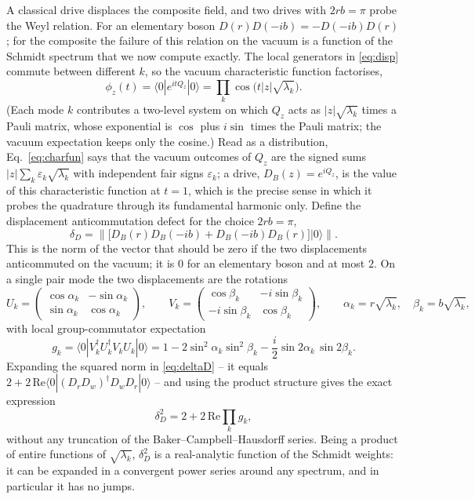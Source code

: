 \documentclass[11pt,a4paper]{article}
\newcommand{\ket}[1]{|#1\rangle}
\newcommand{\bra}[1]{\langle#1|}
\begin{document}
A classical drive displaces the composite field, and two drives with $2rb=\pi$ probe the Weyl relation. For an elementary boson $D(r)D(-ib)=-D(-ib)D(r)$; for the composite the failure of this relation on the vacuum is a function of the Schmidt spectrum that we now compute exactly. The local generators in \eqref{eq:disp} commute between different $k$, so the vacuum characteristic function factorises,
\begin{equation}
\phi_z(t)=\bra{0}e^{itQ_z}\ket{0}=\prod_k\cos\big(t|z|\sqrt{\lambda_k}\big).
\label{eq:charfun}
\end{equation}
(Each mode $k$ contributes a two-level system on which $Q_z$ acts as $|z|\sqrt{\lambda_k}$ times a Pauli matrix, whose exponential is $\cos$ plus $i\sin$ times the Pauli matrix; the vacuum expectation keeps only the cosine.) Read as a distribution, Eq.~\eqref{eq:charfun} says that the vacuum outcomes of $Q_z$ are the signed sums $|z|\sum_k\varepsilon_k\sqrt{\lambda_k}$ with independent fair signs $\varepsilon_k$; a drive, $D_B(z)=e^{iQ_z}$, is the value of this characteristic function at $t=1$, which is the precise sense in which it probes the quadrature through its fundamental harmonic only. Define the displacement anticommutation defect for the choice $2rb=\pi$,
\begin{equation}
\delta_D=\big\|\big[D_B(r)D_B(-ib)+D_B(-ib)D_B(r)\big]\ket{0}\big\|.
\label{eq:deltaD}
\end{equation}
This is the norm of the vector that should be zero if the two displacements anticommuted on the vacuum; it is $0$ for an elementary boson and at most $2$. On a single pair mode the two displacements are the rotations
\begin{equation}
U_k=\begin{pmatrix}\cos\alpha_k&-\sin\alpha_k\\ \sin\alpha_k&\cos\alpha_k\end{pmatrix},\qquad
V_k=\begin{pmatrix}\cos\beta_k&-i\sin\beta_k\\ -i\sin\beta_k&\cos\beta_k\end{pmatrix},\qquad
\alpha_k=r\sqrt{\lambda_k},\quad\beta_k=b\sqrt{\lambda_k},
\end{equation}
with local group-commutator expectation
\begin{equation}
g_k=\bra{0}V_k^\dagger U_k^\dagger V_kU_k\ket{0}=1-2\sin^2\alpha_k\sin^2\beta_k-\frac{i}{2}\sin 2\alpha_k\,\sin 2\beta_k .
\label{eq:gk}
\end{equation}
Expanding the squared norm in \eqref{eq:deltaD} -- it equals $2+2\,\mathrm{Re}\bra0 (D_rD_w)^\dagger D_wD_r\ket0$ -- and using the product structure gives the exact expression
\begin{equation}
\delta_D^2=2+2\,\mathrm{Re}\prod_k g_k ,
\label{eq:product}
\end{equation}
without any truncation of the Baker--Campbell--Hausdorff series. Being a product of entire functions of $\sqrt{\lambda_k}$, $\delta_D^2$ is a real-analytic function of the Schmidt weights: it can be expanded in a convergent power series around any spectrum, and in particular it has no jumps.
\end{document}
